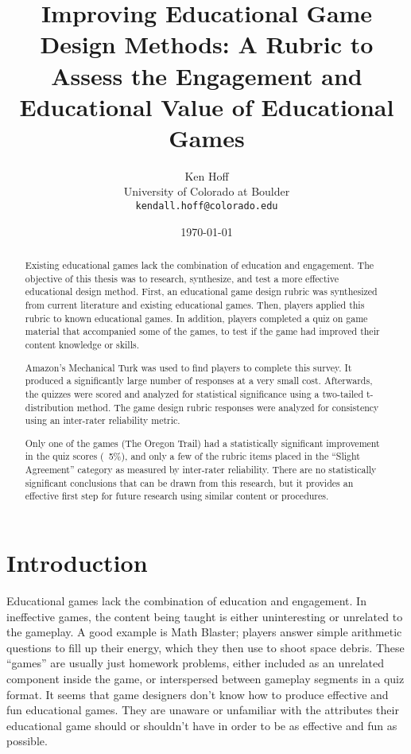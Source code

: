\documentclass[12pt]{report}
\author{Ken Hoff \\ University of Colorado at Boulder \\ \texttt{kendall.hoff@colorado.edu} 
}
\date{\today}
\title{Improving Educational Game Design Methods: A Rubric to Assess the Engagement and Educational Value of Educational Games
}
\begin{document}
\maketitle

\begin{abstract}

Existing educational games lack the combination of education and engagement. The objective of this thesis was to research, synthesize, and test a more effective educational design method. First, an educational game design rubric was synthesized from current literature and existing educational games. Then, players applied this rubric to known educational games. In addition, players completed a quiz on game material that accompanied some of the games, to test if the game had improved their content knowledge or skills.

Amazon's Mechanical Turk was used to find players to complete this survey. It produced a significantly large number of responses at a very small cost. Afterwards, the quizzes were scored and analyzed for statistical significance using a two-tailed t-distribution method. The game design rubric responses were analyzed for consistency using an inter-rater reliability metric.

Only one of the games (The Oregon Trail) had a statistically significant improvement in the quiz scores (~5\%), and only a few of the rubric items placed in the ``Slight Agreement'' category as measured by inter-rater reliability. There are no statistically significant conclusions that can be drawn from this research, but it provides an effective first step for future research using similar content or procedures.

\end{abstract}

\tableofcontents
\listoffigures

\chapter{Introduction}
	Educational games lack the combination of education and engagement. In ineffective games, the content being taught is either uninteresting or unrelated to the gameplay. A good example is Math Blaster; players answer simple arithmetic questions to fill up their energy, which they then use to shoot space debris. These “games” are usually just homework problems, either included as an unrelated component inside the game, or interspersed between gameplay segments in a quiz format. It seems that game designers don't know how to produce effective and fun educational games. They are unaware or unfamiliar with the attributes their educational game should or shouldn't have in order to be as effective and fun as possible.
\end{document}
